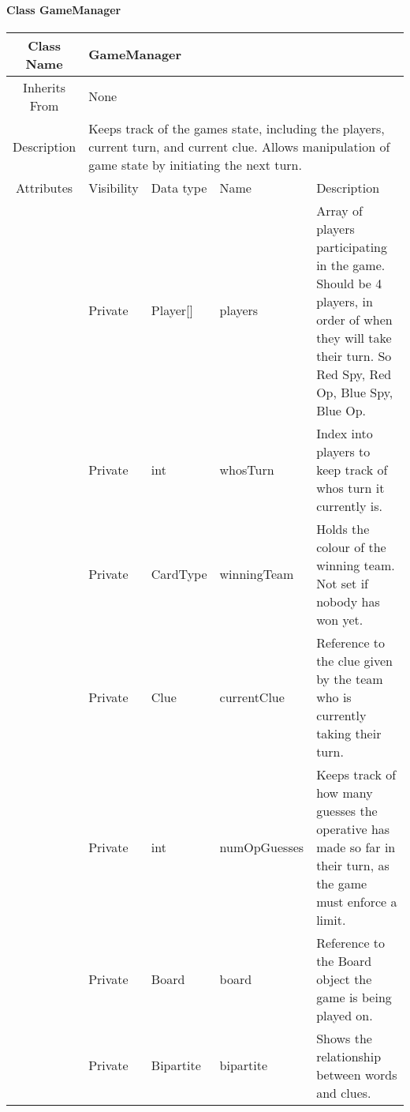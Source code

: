 \paragraph{Class GameManager}\mbox{}
\begin{tabularx}{\textwidth}{|c||l|l|l|X|}
    \hline
    \cellcolor{lightgray}Class Name & \multicolumn{4}{X|}{GameManager}\\
    \hline
    \cellcolor{lightgray}Inherits From & \multicolumn{4}{X|}{None}\\
    \hline
    \cellcolor{lightgray}Description & \multicolumn{4}{p{12cm}|}{Keeps track of the games state, including the players, current turn, and current clue. Allows manipulation of game state by initiating the next turn. }\\

    \hline\hline
    \cellcolor{lightgray}Attributes & \cellcolor{lightgray}Visibility & \cellcolor{lightgray}Data type & \cellcolor{lightgray}Name & \cellcolor{lightgray}Description\\\cline{2-5}
    \cellcolor{lightgray} & Private & Player[] & players & Array of players participating in the game. Should be 4 players, in order of when they will take their turn. So Red Spy, Red Op, Blue Spy, Blue Op.\\ 
    \hline
    \cellcolor{lightgray} & Private & int & whosTurn & Index into players to keep track of whos turn it currently is.\\ 
    \hline
    \cellcolor{lightgray} & Private & CardType & winningTeam & Holds the colour of the winning team. Not set if nobody has won yet.\\ 
    \hline
    \cellcolor{lightgray} & Private & Clue & currentClue & Reference to the clue given by the team who is currently taking their turn. \\ 
    \hline
    \cellcolor{lightgray} & Private & int & numOpGuesses & Keeps track of how many guesses the operative has made so far in their turn, as the game must enforce a limit.\\ 
    \hline
    \cellcolor{lightgray} & Private & Board & board & Reference to the Board object the game is being played on. \\ 
    \hline
    \cellcolor{lightgray} & Private & Bipartite & bipartite & Shows the relationship between words and clues. \\ 
    \hline\hline
    

\end{tabularx}

